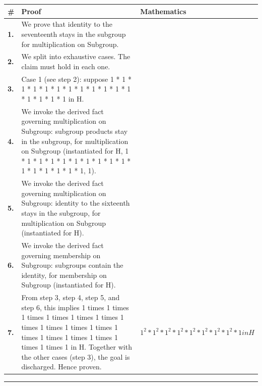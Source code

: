 \documentclass[11pt]{article}
\theoremstyle{definition}
\begin{document}
\begin{tabular}{@{} >{\raggedright\arraybackslash}p{} >{\raggedright\arraybackslash}p{} >{\raggedleft\arraybackslash}p{} @{}}
\textbf{\#} & \textbf{Proof} & \textbf{Mathematics} \\
\midrule
\textbf{1.} & We prove that identity to the seventeenth stays in the subgroup for multiplication on Subgroup. & \\[0.45em]
\textbf{2.} & We split into exhaustive cases. The claim must hold in each one. & \\[0.45em]
\textbf{3.} & Case 1 (see step 2): suppose 1 * 1 * 1 * 1 * 1 * 1 * 1 * 1 * 1 * 1 * 1 * 1 * 1 * 1 * 1 * 1 in H. & \\[0.45em]
\textbf{4.} & We invoke the derived fact governing multiplication on Subgroup: subgroup products stay in the subgroup, for multiplication on Subgroup (instantiated for H, 1 * 1 * 1 * 1 * 1 * 1 * 1 * 1 * 1 * 1 * 1 * 1 * 1 * 1 * 1 * 1, 1). & \\[0.45em]
\textbf{5.} & We invoke the derived fact governing multiplication on Subgroup: identity to the sixteenth stays in the subgroup, for multiplication on Subgroup (instantiated for H). & \\[0.45em]
\textbf{6.} & We invoke the derived fact governing membership on Subgroup: subgroups contain the identity, for membership on Subgroup (instantiated for H). & \\[0.45em]
\textbf{7.} & From step 3, step 4, step 5, and step 6, this implies 1 times 1 times 1 times 1 times 1 times 1 times 1 times 1 times 1 times 1 times 1 times 1 times 1 times 1 times 1 times 1 times 1 in H. Together with the other cases (step 3), the goal is discharged. Hence proven. & $\displaystyle 1^{2} * 1^{2} * 1^{2} * 1^{2} * 1^{2} * 1^{2} * 1^{2} * 1^{2} * 1 in H$ \\[0.45em]
\bottomrule
\end{tabular}
\label{thm:Subgroup-multiplication-identity_to_the_seventeenth_stays_in_the_subgroup}
\par\medskip\hrule
\end{document}
